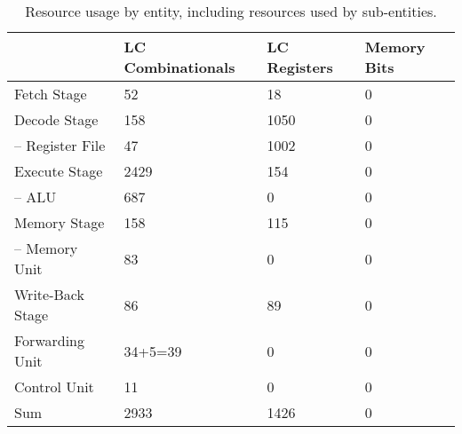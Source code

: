 \begin{table}[htb]
\centering
\caption{Resource usage by entity, including resources used by sub-entities.}
\begin{tabular}{llll}
	\toprule
	                     & LC Combinationals & LC Registers & Memory Bits \\
	\midrule
	Fetch Stage          &         52        &     18       &       0      \\
	Decode Stage         &         158       &     1050     &       0      \\
	-- Register File     &         47        &     1002     &       0      \\
	Execute Stage        &         2429      &     154      &       0      \\
	-- ALU               &         687       &     0        &       0      \\
	Memory Stage         &         158       &     115      &       0      \\
	-- Memory Unit       &         83        &     0        &       0      \\
	Write-Back Stage     &         86        &     89       &       0      \\
	Forwarding Unit      &         34+5=39   &     0        &       0      \\
	Control Unit         &         11        &     0        &       0      \\
	\cmidrule{1-4}
	Sum                  &         2933      &     1426     &       0      \\
\bottomrule
\end{tabular}
\end{table}

\begin{qa}
\end{qa}

